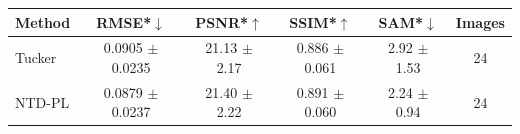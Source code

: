 \begin{tabular}{@{}l c c c c c@{}}
\toprule
Method & RMSE*$\downarrow$ & PSNR*$\uparrow$ & SSIM*$\uparrow$ & SAM*$\downarrow$ & Images\\
\midrule
Tucker & 0.0905 $\pm$ 0.0235 & 21.13 $\pm$ 2.17 & 0.886 $\pm$ 0.061 & 2.92 $\pm$ 1.53 & 24\\
NTD-PL & 0.0879 $\pm$ 0.0237 & 21.40 $\pm$ 2.22 & 0.891 $\pm$ 0.060 & 2.24 $\pm$ 0.94 & 24\\
\bottomrule
\end{tabular}
